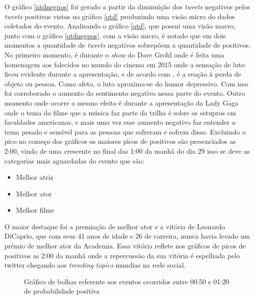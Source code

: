 O gráfico \ref{qtdnegpos} foi gerado a partir da diminuição dos \textit{tweets} negativos pelos \textit{tweets} positivos vistos no gráfico \ref{qtd} produzindo uma visão micro do dados coletados do evento. Analisando o gráfico \ref{qtd}, que possui uma visão macro, junto com o gráfico \ref{qtdnegpos}, com a visão micro, é notado que em dois momentos a quantidade de \textit{tweets} negativos sobrepõem a quantidade de positivos. No primeiro momento, é durante o \textit{show} do Dave Grohl onde é feita uma homenagem aos falecidos no mundo do cinema em 2015 onde a sensação de luto ficou evidente durante a apresentação, e de acordo com \cite{freud1908conferencias}, é a reação à perda de objeto ou pessoa. Como afeto, o luto aproxima-se do humor depressivo. Com isso foi corroborado o aumento do sentimento negativo nessa parte do evento. Outro momento onde ocorre o mesmo efeito é durante a apresentação da Lady Gaga onde o tema do filme que a  música faz parte da trilha é sobre os estupros em faculdades americanas, e mais uma vez esse aumento negativo faz entender o tema pesado e sensível para as pessoas que sofreram e sofrem disso. Excluindo o pico no começo dos gráficos os maiores picos de positivos são presenciados as 2:00, vindo de uma crescente no final das 1:00 da manhã do dia 29 isso se deve as categorias mais aguardadas do evento que são:

 \begin{itemize}
 	\item Melhor atriz
 	\item Melhor ator
 	\item Melhor filme
 \end{itemize}

O maior destaque foi a premiação de melhor ator e a vitória de Leonardo DiCaprio, que com seus 41 anos de idade e 26 de carreira, nunca havia levado um prêmio de melhor ator da Academia. Essa vitória reflete nos gráficos de picos de positivos as 2:00 da manhã onde a repercussão da sua vitória é espelhada pelo twitter chegando aos \textit{trending topics} mundias na rede social.



\begin{figure}[H]
	\centering{}
	\caption{Gráfico de bolhas referente aos eventos ocorridos entre 00:50 e 01:20 de probabilidade positiva}
	\label{pos1}
\end{figure}

